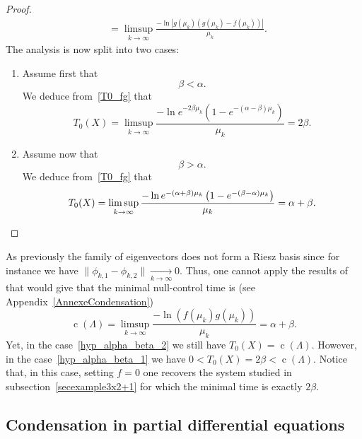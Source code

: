 \documentclass[AHL,Unicode,longabstracts]{cedram}
\DeclareMathOperator{\cond}{c}
\begin{document}
\begin{proof}
\begin{equation}
\begin{aligned}
&= \limsup_{k \to \infty} \frac{ -\ln \left| g(\mu_k) (g(\mu_k) - f(\mu_k)) \right| }{\mu_k}.
\end{aligned}
\end{equation}
The analysis is now split into two cases:
\begin{enumerate}
\item \label{list-pr-prop5.7.1}Assume first that
\begin{equation}\label{hyp_alpha_beta_1}
\beta < \alpha.
\end{equation}
We deduce from~\eqref{T0_fg} that
\[
T_0(X) = \limsup_{k \to \infty} \frac{ -\ln e^{-2\beta \mu_k} \left(1- e^{-(\alpha-\beta) \mu_k} \right) }{\mu_k} = 2 \beta.
\]
\item \label{list-pr-prop5.7.2}Assume now that
\begin{equation}\label{hyp_alpha_beta_2}
\beta > \alpha.
\end{equation}
We deduce from~\eqref{T0_fg} that
\[
T_0(X) = \limsup_{k \to \infty} \frac{ -\ln e^{-(\alpha+\beta) \mu_k} \left(1- e^{-(\beta-\alpha) \mu_k} \right) }{\mu_k} = \alpha + \beta.\qedhere
\]
\end{enumerate}
\end{proof}



\begin{rema}
As previously the family of eigenvectors does not form a Riesz basis since for instance we have $\| \phi_{k,1} - \phi_{k,2} \| \underset{k \to \infty}{\longrightarrow} 0$. Thus, one cannot apply the results of~\cite{AmmarKhodjaBenabdallahGonzalez-BurgosdeTeresa:2014} that would give that the minimal null-control time is (see Appendix~\ref{AnnexeCondensation})
\[
\cond(\Lambda)=\limsup_{k \to \infty} \frac{-\ln \left(f(\mu_k)g(\mu_k)\right)}{\mu_k} = \alpha + \beta.
\]
Yet, in the case~\eqref{hyp_alpha_beta_2} we still have $T_0(X)=\cond(\Lambda)$. However, in the case~\eqref{hyp_alpha_beta_1} we have $0<T_0(X) = 2 \beta < \cond(\Lambda)$. Notice that, in this case, setting $f=0$ one recovers the system studied in subsection~\ref{secexample3x2+1} for which the minimal time is exactly $2\beta$.
\end{rema}



\subsection{Condensation in partial differential equations} \label{Subsec:ExemplesEDP}
\end{document}
